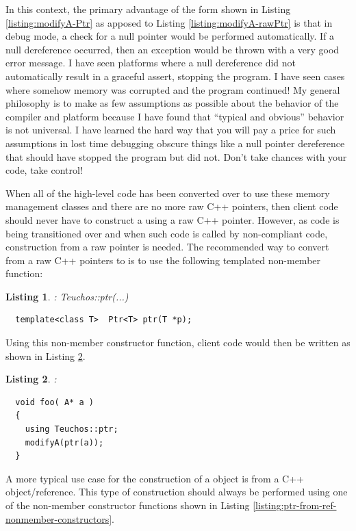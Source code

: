 \documentclass[pdf,ps2pdf,11pt]{SANDreport}
\newtheorem{listing}{Listing}
\begin{document}
In this context, the primary advantage of the form shown in Listing
{}\ref{listing:modifyA-Ptr} as apposed to Listing
{}\ref{listing:modifyA-rawPtr} is that in debug mode, a check for a
null pointer would be performed automatically.  If a null dereference
occurred, then an exception would be thrown with a very good error
message. I have seen platforms where a null dereference did not
automatically result in a graceful assert, stopping the program.  I
have seen cases where somehow memory was corrupted and the program
continued!  My general philosophy is to make as few assumptions as
possible about the behavior of the compiler and platform because I
have found that ``typical and obvious'' behavior is not universal.  I
have learned the hard way that you will pay a price for such
assumptions in lost time debugging obscure things like a null pointer
dereference that should have stopped the program but did not.  Don't
take chances with your code, take control!

When all of the high-level code has been converted over to use these
memory management classes and there are no more raw C++ pointers, then
client code should never have to construct a {} using a
raw C++ pointer.  However, as code is being transitioned over and
when such code is called by non-compliant code, construction from a
raw pointer is needed.  The recommended way to convert from a raw C++
pointers to {} is to use the following templated
non-member function:

\begin{listing}: Teuchos::ptr(...)\\
\label{listing:ptr}
{\small\begin{verbatim}
  template<class T>  Ptr<T> ptr(T *p);
\end{verbatim}}
\end{listing}

Using this non-member constructor function, client code would then be
written as shown in Listing {}\ref{listing:using-ptr}.

\begin{listing}:\\
\label{listing:using-ptr}
{\small\begin{verbatim}
  void foo( A* a )
  {
    using Teuchos::ptr;
    modifyA(ptr(a));
  }
\end{verbatim}}
\end{listing}

A more typical use case for the construction of a {}
object is from a C++ object/reference.  This type of construction
should always be performed using one of the non-member constructor
functions shown in Listing
{}\ref{listing:ptr-from-ref-nonmember-constructors}.
\end{document}
